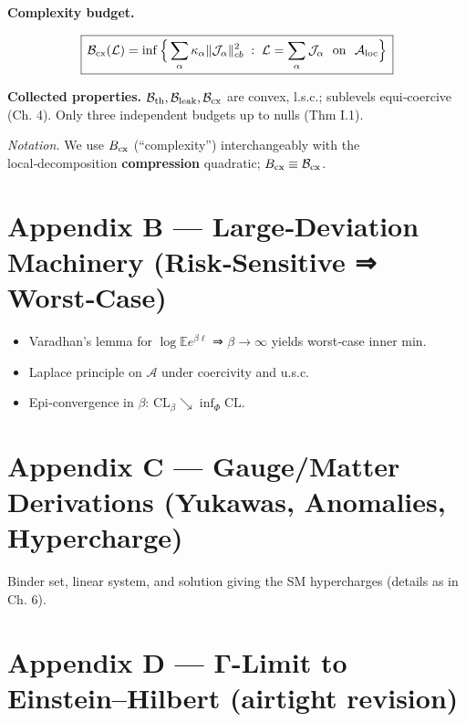 \documentclass[
]{article}
\providecommand{\tightlist}{%
  \setlength{\itemsep}{0pt}\setlength{\parskip}{0pt}}
\numberwithin{equation}{section}
\begin{document}
\textbf{Complexity budget.}

\[
\boxed{\,\mathcal B_{\rm cx}(\mathcal L)
= \inf\Big\{\sum_\alpha \kappa_\alpha \|\mathcal J_\alpha\|_{cb}^2\;:\; 
\mathcal L=\sum_\alpha \mathcal J_\alpha\ \text{ on }\ \mathcal A_{\rm loc}\Big\}\,}
\]

\textbf{Collected properties.}
\(\mathcal B_{\rm th},\mathcal B_{\rm leak},\mathcal B_{\rm cx}\) are
convex, l.s.c.; sublevels equi‑coercive (Ch. 4). Only three independent
budgets up to nulls (Thm I.1).

\emph{Notation.} We use \textbf{\(B_{\rm cx}\)} (``complexity'')
interchangeably with the local‑decomposition \textbf{compression}
quadratic; \(B_{\rm cx}\equiv \mathcal B_{\rm cx}\).

\hypertarget{appendix-b-largedeviation-machinery-risksensitive-worstcase}{%
\section{Appendix B --- Large‑Deviation Machinery (Risk‑Sensitive ⇒
Worst‑Case)}\label{appendix-b-largedeviation-machinery-risksensitive-worstcase}}

\begin{itemize}
\tightlist
\item
  Varadhan's lemma for \(\log\mathbb E e^{\beta\ell}\) ⇒
  \(\beta\to\infty\) yields worst‑case inner min.
\item
  Laplace principle on \(\mathcal A\) under coercivity and u.s.c.
\item
  Epi‑convergence in \(\beta\):
  \(\mathrm{CL}_\beta\searrow \inf_\Phi \mathrm{CL}\).
\end{itemize}

\hypertarget{appendix-c-gaugematter-derivations-yukawas-anomalies-hypercharge}{%
\section{Appendix C --- Gauge/Matter Derivations (Yukawas, Anomalies,
Hypercharge)}\label{appendix-c-gaugematter-derivations-yukawas-anomalies-hypercharge}}

Binder set, linear system, and solution giving the SM hypercharges
(details as in Ch. 6).

\hypertarget{appendix-d-ux3b3-limit-to-einsteinhilbert-airtight-revision}{%
\section{Appendix D --- Γ-Limit to Einstein--Hilbert (airtight
revision)}\label{appendix-d-ux3b3-limit-to-einsteinhilbert-airtight-revision}}
\end{document}

